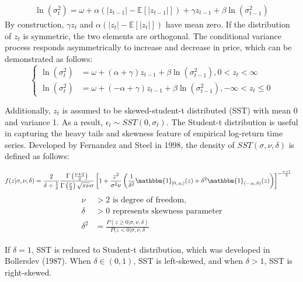 \documentclass[12pt,a4paper]{article}
\numberwithin{equation}{section}
\begin{document}
  \begin{align*}
  \ln\left(\sigma_t^2\right) = \omega + \alpha \left( |z_{t-1}| - \mathbb{E}[|z_{t-1}|] \right) + \gamma z_{t-1} +  \beta \ln\left(\sigma_{t-1}^2\right)
 \end{align*}
By construction, $\gamma z_t$ and $\alpha (|z_t| - \mathbb{E}[|z_t|])$ have mean zero. If the distribution of $z_t$ is symmetric, the two elements are orthogonal. The conditional variance process responds asymmetrically to increase and decrease in price, which can be demonstrated as follows: 
 \begin{equation}
 \begin{cases}
 \ln\left(\sigma_t^2\right) &= \omega + (\alpha + \gamma) z_{t-1} +  \beta \ln\left(\sigma_{t-1}^2\right), 0 < z_t < \infty \\[0.6em]
 \ln\left(\sigma_t^2\right) &= \omega + (-\alpha + \gamma) z_{t-1} +  \beta \ln\left(\sigma_{t-1}^2\right), -\infty < z_t \le 0
 \end{cases}
 \end{equation}

Additionally, $z_t$ is assumed to be skewed-student-t distributed (SST) with mean 0 and variance 1. As a result, $\epsilon_t \sim SST(0, \sigma_t)$. The Student-t distribution is useful in capturing the heavy tails and skewness feature of empirical log-return time series. Developed by Fernandez and Steel in 1998, the density of $SST(\sigma, \nu, \delta)$ is defined as follows:


\begin{align}
f(z|\sigma, \nu, \delta) &= \frac{2}{\delta+ \frac{1}{\delta}} \frac{\Gamma\left(\frac{\nu + 1}{2}\right)}{\Gamma\left(\frac{\nu}{2}\right) \sqrt{\pi \nu}\sigma}
\left[ 1 + \frac{z^2}{\sigma^2 \nu} \left( \frac{1}{\delta^2} \mathbbm{1}_{[0, \infty)} (z) + \delta^2 \mathbbm{1}_{(-\infty, 0)} (z) \right) \right]^{-\frac{\nu + 1}{2}}
\end{align}
\begin{align}
\nu &>2 \text{ is degree of freedom}, \\
\delta&>0 \text{ represents skewness parameter}\\
\delta^2 &= \frac{P(z \ge 0| \sigma, \nu, \delta)}{P(z < 0| \sigma, \nu, \delta}
\end{align}

If $\delta = 1$, SST is reduced to Student-t distribution, which was developed in Bollerslev (1987). When $\delta  \in (0,1)$, SST is left-skewed, and when $\delta > 1$, SST is right-skewed.
\end{document}
